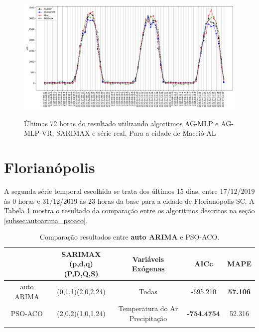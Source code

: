 \begin{figure}[!htbp]
    \centering
    \caption{Últimas 72 horas do resultado utilizando algoritmos AG-MLP e AG-MLP-VR, SARIMAX e série real. Para a cidade de Maceió-AL}
    \includegraphics[width=\textwidth]{Figuras/cap4/comparison_hibrids_mc.png}
    \label{fig:cap4_maceio_3_days_hibrids}
\end{figure}

\section{Florianópolis}

A segunda série temporal escolhida se trata dos últimos 15 dias, entre 17/12/2019 às 0 horas e 31/12/2019 às 23 horas da base para a cidade de Florianópolis-SC. A Tabela \ref{tab:cap4_comp_flor_autoarima_psoaco} mostra o resultado da comparação entre os algoritmos descritos na seção \ref{subsec:autoarima_psoaco}.

\begin{table}[htbp]
\caption{Comparação resultados entre \textbf{auto ARIMA} e PSO-ACO.}
\begin{center}
\begin{tabular}{ccccc}
                    & \Longstack{SARIMAX \\ (p,d,q)(P,D,Q,S)} & Variáveis Exógenas & AICc & MAPE  \\\hline
auto ARIMA & (0,1,1)(2,0,2,24) & Todas & -695.210 & \textbf{57.106} \\\hline
PSO-ACO             & (2,0,2)(1,0,1,24) & \Longstack{Temperatura do Ar \\ Precipitação} & \textbf{-754.4754} & 52.316 \\\hline
\label{tab:cap4_comp_flor_autoarima_psoaco}
\end{tabular}
\end{center}
\end{table}


